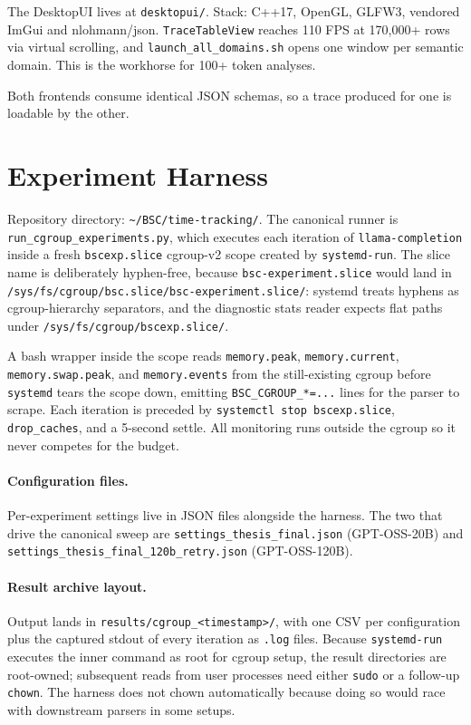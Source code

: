 The DesktopUI lives at \texttt{desktopui/}. Stack: C++17, OpenGL, GLFW3, vendored ImGui and nlohmann/json. \texttt{TraceTableView} reaches 110 FPS at 170,000+ rows via virtual scrolling, and \texttt{launch\_all\_domains.sh} opens one window per semantic domain. This is the workhorse for 100+ token analyses.

Both frontends consume identical JSON schemas, so a trace produced for one is loadable by the other.


\section{Experiment Harness}\label{sec:art-harness}

Repository directory: \texttt{\textasciitilde/BSC/time-tracking/}. The canonical runner is \texttt{run\_cgroup\_experiments.py}, which executes each iteration of \texttt{llama-completion} inside a fresh \texttt{bscexp.slice} cgroup-v2 scope created by \texttt{systemd-run}. The slice name is deliberately hyphen-free, because \texttt{bsc-experiment.slice} would land in \texttt{/sys/fs/cgroup/bsc.slice/bsc-experiment.slice/}: systemd treats hyphens as cgroup-hierarchy separators, and the diagnostic stats reader expects flat paths under \texttt{/sys/fs/cgroup/bscexp.slice/}.

{\sloppy
A bash wrapper inside the scope reads \texttt{memory.peak}, \texttt{memory.current}, \texttt{memory.swap.peak}, and \texttt{memory.events} from the still-existing cgroup before \texttt{systemd} tears the scope down, emitting \texttt{BSC\_CGROUP\_*=...} lines for the parser to scrape. Each iteration is preceded by \texttt{systemctl stop bscexp.slice}, \texttt{drop\_caches}, and a 5-second settle. All monitoring runs outside the cgroup so it never competes for the budget.
\par}

\paragraph{Configuration files.} Per-experiment settings live in JSON files alongside the harness. The two that drive the canonical sweep are \texttt{settings\_thesis\_final.json} (GPT-OSS-20B) and \texttt{settings\_thesis\_final\_120b\_retry.json} (GPT-OSS-120B).

\paragraph{Result archive layout.} Output lands in \texttt{results/cgroup\_<timestamp>/}, with one CSV per configuration plus the captured stdout of every iteration as \texttt{.log} files. Because \texttt{systemd-run} executes the inner command as root for cgroup setup, the result directories are root-owned; subsequent reads from user processes need either \texttt{sudo} or a follow-up \texttt{chown}. The harness does not chown automatically because doing so would race with downstream parsers in some setups.


